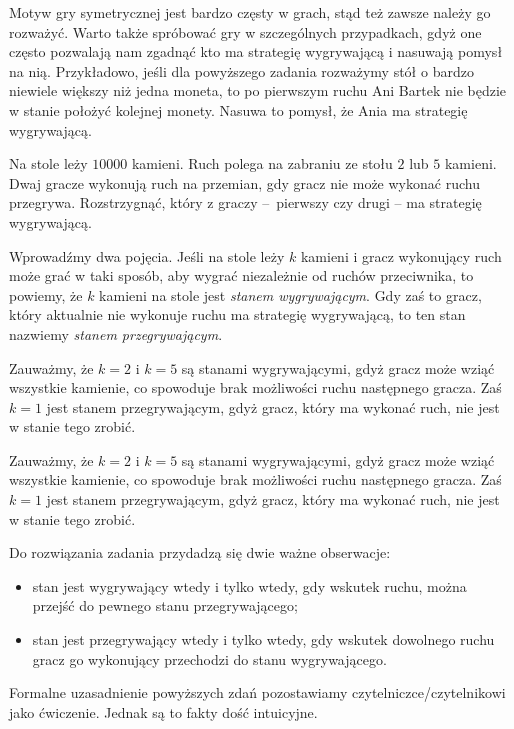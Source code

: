 \vspace{10px}

\noindent
Motyw gry symetrycznej jest bardzo częsty w grach, stąd też zawsze należy go rozważyć. Warto także spróbować gry w szczególnych przypadkach, gdyż one często pozwalają nam zgadnąć kto ma strategię wygrywającą i nasuwają pomysł na nią. Przykładowo, jeśli dla powyższego zadania rozważymy stół o bardzo niewiele większy niż jedna moneta, to po pierwszym ruchu Ani Bartek nie będzie w stanie położyć kolejnej monety. Nasuwa to pomysł, że Ania ma strategię wygrywającą.

\vspace{10px}


\noindent
Na stole leży $10000$ kamieni. Ruch polega na zabraniu ze stołu $2$ lub $5$ kamieni. Dwaj gracze wykonują ruch na przemian, gdy gracz nie może wykonać ruchu przegrywa. Rozstrzygnąć, który z graczy – pierwszy czy drugi – ma strategię wygrywającą.

\vspace{5px}


\noindent
Wprowadźmy dwa pojęcia. Jeśli na stole leży $k$ kamieni i gracz wykonujący ruch może grać w taki sposób, aby wygrać niezależnie od ruchów przeciwnika, to powiemy, że $k$ kamieni na stole jest \textit{stanem wygrywającym}. Gdy zaś to gracz, który aktualnie nie wykonuje ruchu ma strategię wygrywającą, to ten stan nazwiemy \textit{stanem przegrywającym}.

\vspace{10px}
\noindent
Zauważmy, że $k = 2$ i $k = 5$ są stanami wygrywającymi, gdyż gracz może wziąć wszystkie kamienie, co spowoduje brak możliwości ruchu następnego gracza. Zaś $k = 1$ jest stanem przegrywającym, gdyż gracz, który ma wykonać ruch, nie jest w stanie tego zrobić.

\vspace{10px}
\noindent
Zauważmy, że $k = 2$ i $k = 5$ są stanami wygrywającymi, gdyż gracz może wziąć wszystkie kamienie, co spowoduje brak możliwości ruchu następnego gracza. Zaś $k = 1$ jest stanem przegrywającym, gdyż gracz, który ma wykonać ruch, nie jest w stanie tego zrobić.

\vspace{10px}
\noindent
Do rozwiązania zadania przydadzą się dwie ważne obserwacje:
\begin{itemize}
	\item stan jest wygrywający wtedy i tylko wtedy, gdy wskutek ruchu, można przejść do pewnego stanu przegrywającego; 
	\item stan jest przegrywający wtedy i tylko wtedy, gdy wskutek dowolnego ruchu gracz go wykonujący przechodzi do stanu wygrywającego.
\end{itemize}
Formalne uzasadnienie powyższych zdań pozostawiamy czytelniczce/czytelnikowi jako ćwiczenie. Jednak są to fakty dość intuicyjne.


